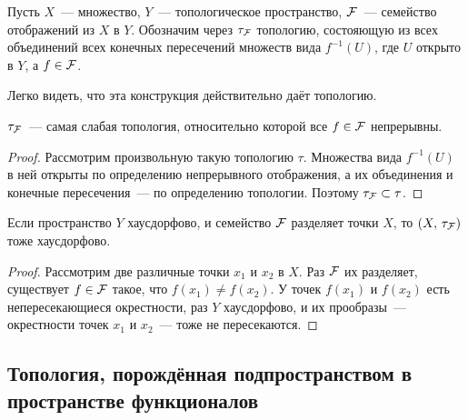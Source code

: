 \documentclass{notes}
\begin{document}
	\begin{de}
		Пусть $X$~--- множество, $Y$~--- топологическое пространство, $\mathcal{F}$~--- семейство отображений из $X$ в $Y$. Обозначим через $\tau_{\mathcal{F}}$ топологию, состояющую из всех объединений всех конечных пересечений множеств вида $f^{-1}(U)$, где $U$ открыто в $Y$, а $f \in \mathcal{F}$.
	\end{de}

	\begin{rem}
		Легко видеть, что эта конструкция действительно даёт топологию.
	\end{rem}

	\begin{st}
		$\tau_{\mathcal{F}}$~--- самая слабая топология, относительно которой все $f \in \mathcal{F}$ непрерывны.
		\begin{proof}
			Рассмотрим произвольную такую топологию $\tau$. Множества вида $f^{-1}(U)$ в ней открыты по определению непрерывного отображения, а их объединения и конечные пересечения~--- по определению топологии. Поэтому $\tau_{\mathcal{F}} \subset \tau$.
		\end{proof}
	\end{st}

	\begin{st}
		Если пространство $Y$ хаусдорфово, и семейство $\mathcal{F}$ разделяет точки $X$, то $(X, \, \tau_{\mathcal{F}})$ тоже хаусдорфово.
		\begin{proof}
			Рассмотрим две различные точки $x_1$ и $x_2$ в $X$. Раз $\mathcal{F}$ их разделяет, существует $f \in \mathcal{F}$ такое, что $f(x_1) \neq f(x_2)$. У точек $f(x_1)$ и $f(x_2)$ есть непересекающиеся окрестности, раз $Y$ хаусдорфово, и их прообразы~--- окрестности точек $x_1$ и $x_2$~--- тоже не пересекаются.
		\end{proof}
	\end{st}

\subsection{Топология, порождённая подпространством в пространстве функционалов}
\end{document}
